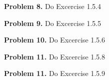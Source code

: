 \documentclass[oneside,12pt]{amsart}
\begin{document}
\textbf{Problem 8.} Do Excercise 1.5.4

\bigskip
\bigskip
\bigskip
\bigskip
\bigskip
\bigskip
\bigskip
\bigskip
\bigskip
\bigskip

\textbf{Problem 9.} Do Excercise 1.5.5

\bigskip
\bigskip
\bigskip
\bigskip
\bigskip
\bigskip
\bigskip
\bigskip
\bigskip
\bigskip

\textbf{Problem 10.} Do Excercise 1.5.6

\bigskip
\bigskip
\bigskip
\bigskip
\bigskip
\bigskip
\bigskip
\bigskip
\bigskip
\bigskip

\textbf{Problem 11.} Do Excercise 1.5.8

\bigskip
\bigskip
\bigskip
\bigskip
\bigskip
\bigskip
\bigskip
\bigskip
\bigskip
\bigskip

\textbf{Problem 11.} Do Excercise 1.5.9

\bigskip
\bigskip
\bigskip
\bigskip
\bigskip
\bigskip
\bigskip
\bigskip
\bigskip
\bigskip
\end{document}
